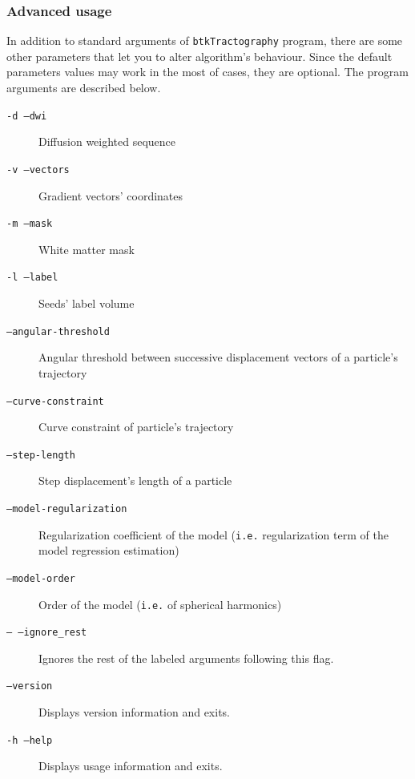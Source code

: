     \subsubsection*{Advanced usage}
        In addition to standard arguments of \texttt{btkTractography} program, there are some other parameters that let you to alter algorithm's behaviour. Since the default parameters values may work in the most of cases, they are optional. The program arguments are described below.
            \begin{description}
                \item[\texttt{-d --dwi}] Diffusion weighted sequence
                \item[\texttt{-v --vectors}] Gradient vectors' coordinates
                \item[\texttt{-m --mask}] White matter mask
                \item[\texttt{-l --label}] Seeds' label volume
                \item[\texttt{--angular-threshold}] Angular threshold between successive displacement vectors of a particle's trajectory
                \item[\texttt{--curve-constraint}] Curve constraint of particle's trajectory
                \item[\texttt{--step-length}] Step displacement's length of a particle
                \item[\texttt{--model-regularization}] Regularization coefficient of the model (\texttt{i.e.} regularization term of the model regression estimation)
                \item[\texttt{--model-order}] Order of the model (\texttt{i.e.} of spherical harmonics)
                \item[\texttt{-- --ignore\_rest}] Ignores the rest of the labeled arguments following this flag.
                \item[\texttt{--version}] Displays version information and exits.
                \item[\texttt{-h --help}] Displays usage information and exits.
            \end{description}

